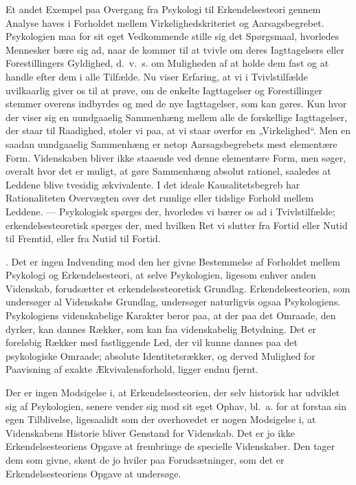 \documentclass[12pt]{article}
\newcommand{\opage}[1]{\marginnote{\footnotesize\textit{[#1]}}}
\begin{document}
Et andet Exempel paa Overgang fra Psykologi til Erkendelsesteori gennem Analyse
haves i Forholdet mellem Virkelighedskriteriet og Aarsagsbegrebet. Psykologien
maa for sit eget Vedkommende stille sig det Spørgsmaal, hvorledes Mennesker bære
sig ad, naar de kommer til at tvivle om deres Iagttagelsers eller Forestillingers
Gyldighed, d.~v.~s. om Muligheden af at holde dem fast og at handle efter dem i
alle Tilfælde. Nu viser Erfaring, at vi i Tvivlstilfælde uvilkaarlig giver os
til at prøve, om de enkelte Iagttagelser og Forestillinger stemmer overens
indbyrdes og med de nye Iagttagelser, som kan gøres. Kun hvor der viser sig en
uundgaaelig Sammenhæng mellem alle de forskellige Iagttagelser, der staar til
Raadighed, stoler vi paa, at vi staar overfor en „Virkelighed“. Men en saadan
uundgaaelig Sammenhæng er netop Aarsagsbegrebets mest elementære Form.
Videnskaben bliver ikke staaende ved denne elementære Form, men søger, overalt
hvor det er muligt, at gøre Sammenhæng absolut rationel, saaledes at Leddene
blive tvesidig ækvivalente. I det ideale Kausalitetsbegreb har Rationaliteten
Overvægten over det rumlige eller tidslige Forhold mellem Leddene. ---
Psykologisk spørges der, hvorledes vi bærer os ad i Tvivlstilfælde;
erkendelsesteoretisk spørges der, med hvilken Ret vi slutter fra Fortid eller
Nutid til Fremtid, eller fra Nutid til Fortid.

. Det er ingen Indvending mod den her givne Bestemmelse af Forholdet mellem
Psykologi og Erkendelsesteori, at selve Psykologien, ligesom enhver anden
Videnskab, forudsætter et erkendelsesteoretisk Grundlag. Erkendelsesteorien, som
undersøger al Videnskabs Grundlag, undersøger naturligvis ogsaa Psykologiens.
Psykologiens videnskabelige Karakter beror paa, at der paa det Omraade, den
dyrker, kan dannes Rækker, som kan faa videnskabelig Betydning. Det er
foreløbig Rækker med fastliggende Led, der vil kunne dannes paa det psykologiske
\opage{18}Omraade; absolute Identitetsrækker, og derved Mulighed for Paavisning
af exakte Ækvivalensforhold, ligger endnu fjernt.

Der er ingen Modsigelse i, at Erkendelsesteorien, der selv historisk har
udviklet sig af Psykologien, senere vender sig mod sit eget Ophav, bl.~a. for at
forstaa sin egen Tilblivelse, ligesaalidt som der overhovedet er nogen
Modsigelse i, at Videnskabens Historie bliver Genstand for Videnskab. Det er jo
ikke Erkendelsesteoriens Opgave at frembringe de specielle Videnskaber. Den tager
dem som givne, skønt de jo hviler paa Forudsætninger, som det er
Erkendelsesteoriens Opgave at undersøge.
\end{document}
